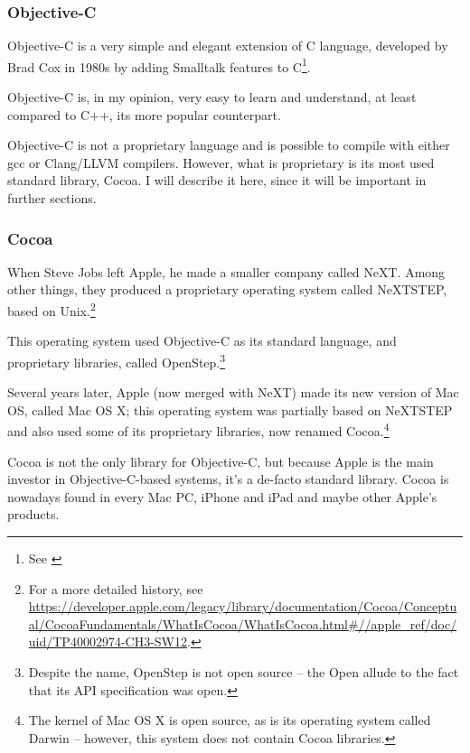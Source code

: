 
\subsubsection{Objective-C}
Objective-C is a very simple and elegant extension of C language, developed by Brad Cox in 1980s by adding Smalltalk features to C\footnote{See \cite{cocoa4}}. 

Objective-C is, in my opinion, very easy to learn and understand, at least compared to C++, its more popular counterpart.

Objective-C is not a proprietary language and is possible to compile with either gcc or Clang/LLVM compilers. However, what is proprietary is its most used standard library, Cocoa.
I will describe it here, since it will be important in further sections.

\subsubsection{Cocoa}
When Steve Jobs left Apple, he made a smaller company called NeXT. Among other things, they produced a proprietary operating system called NeXTSTEP, based on Unix.\footnote{For a more detailed history, see \url{https://developer.apple.com/legacy/library/documentation/Cocoa/Conceptual/CocoaFundamentals/WhatIsCocoa/WhatIsCocoa.html\#//apple\_ref/doc/uid/TP40002974-CH3-SW12}.}

This operating system used Objective-C as its standard language, and proprietary libraries, called OpenStep.\footnote{Despite the name, OpenStep is not open source -- the Open allude to the fact that its API specification was open.}

Several years later, Apple (now merged with NeXT) made its new version of Mac OS, called Mac OS X; this operating system was partially based on NeXTSTEP and also used some of its proprietary libraries, now renamed Cocoa.\footnote{The kernel of Mac OS X is open source, as is its  operating system called Darwin -- however, this system does not contain Cocoa libraries.}

Cocoa is not the only library for Objective-C, but because Apple is the main investor in Objective-C-based systems, it's a de-facto standard library. Cocoa is nowadays found in every Mac PC, iPhone and iPad and maybe other Apple's products.


